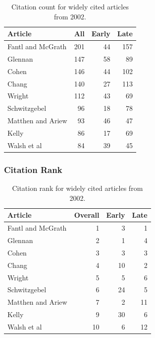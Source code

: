 \documentclass[
  10pt,
  letterpaper,
  DIV=11,
  numbers=noendperiod,
  twoside]{scrartcl}
\begin{document}
\begin{longtable}[]{@{}lrrr@{}}

\caption{\label{tbl-citation-count-2002}Citation count for widely cited
articles from 2002.}

\tabularnewline

\toprule\noalign{}
Article & All & Early & Late \\
\midrule\noalign{}
\endhead
\bottomrule\noalign{}
\endlastfoot
Fantl and McGrath & 201 & 44 & 157 \\
Glennan & 147 & 58 & 89 \\
Cohen & 146 & 44 & 102 \\
Chang & 140 & 27 & 113 \\
Wright & 112 & 43 & 69 \\
Schwitzgebel & 96 & 18 & 78 \\
Matthen and Ariew & 93 & 46 & 47 \\
Kelly & 86 & 17 & 69 \\
Walsh et al & 84 & 39 & 45 \\

\end{longtable}

\subsubsection*{Citation Rank}\label{sec-rank-2002}

\begin{longtable}[]{@{}lrrr@{}}

\caption{\label{tbl-citation-rank-2002}Citation rank for widely cited
articles from 2002.}

\tabularnewline

\toprule\noalign{}
Article & Overall & Early & Late \\
\midrule\noalign{}
\endhead
\bottomrule\noalign{}
\endlastfoot
Fantl and McGrath & 1 & 3 & 1 \\
Glennan & 2 & 1 & 4 \\
Cohen & 3 & 3 & 3 \\
Chang & 4 & 10 & 2 \\
Wright & 5 & 5 & 6 \\
Schwitzgebel & 6 & 24 & 5 \\
Matthen and Ariew & 7 & 2 & 11 \\
Kelly & 9 & 30 & 6 \\
Walsh et al & 10 & 6 & 12 \\

\end{longtable}
\end{document}

